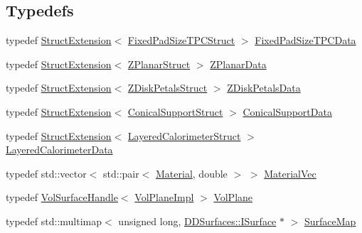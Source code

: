 \subsection*{Typedefs}
\begin{DoxyCompactItemize}
\item 
typedef \hyperlink{struct_d_d4hep_1_1_d_d_rec_1_1_struct_extension}{Struct\+Extension}$<$ \hyperlink{struct_d_d4hep_1_1_d_d_rec_1_1_fixed_pad_size_t_p_c_struct}{Fixed\+Pad\+Size\+T\+P\+C\+Struct} $>$ \hyperlink{namespace_d_d4hep_1_1_d_d_rec_a4fe537dc27f78fad18b8182f6f167ca1}{Fixed\+Pad\+Size\+T\+P\+C\+Data}
\item 
typedef \hyperlink{struct_d_d4hep_1_1_d_d_rec_1_1_struct_extension}{Struct\+Extension}$<$ \hyperlink{struct_d_d4hep_1_1_d_d_rec_1_1_z_planar_struct}{Z\+Planar\+Struct} $>$ \hyperlink{namespace_d_d4hep_1_1_d_d_rec_a33d4dff6a0b5ce47e490b050a3c5f69a}{Z\+Planar\+Data}
\item 
typedef \hyperlink{struct_d_d4hep_1_1_d_d_rec_1_1_struct_extension}{Struct\+Extension}$<$ \hyperlink{struct_d_d4hep_1_1_d_d_rec_1_1_z_disk_petals_struct}{Z\+Disk\+Petals\+Struct} $>$ \hyperlink{namespace_d_d4hep_1_1_d_d_rec_a589fa302569ee79d91b34ff0d97d4a78}{Z\+Disk\+Petals\+Data}
\item 
typedef \hyperlink{struct_d_d4hep_1_1_d_d_rec_1_1_struct_extension}{Struct\+Extension}$<$ \hyperlink{struct_d_d4hep_1_1_d_d_rec_1_1_conical_support_struct}{Conical\+Support\+Struct} $>$ \hyperlink{namespace_d_d4hep_1_1_d_d_rec_ad032e209cba53400573169b32816f1c9}{Conical\+Support\+Data}
\item 
typedef \hyperlink{struct_d_d4hep_1_1_d_d_rec_1_1_struct_extension}{Struct\+Extension}$<$ \hyperlink{struct_d_d4hep_1_1_d_d_rec_1_1_layered_calorimeter_struct}{Layered\+Calorimeter\+Struct} $>$ \hyperlink{namespace_d_d4hep_1_1_d_d_rec_ab7bf707189c3166efa20740e6f7524b9}{Layered\+Calorimeter\+Data}
\item 
typedef std\+::vector$<$ std\+::pair$<$ \hyperlink{class_d_d4hep_1_1_geometry_1_1_material}{Material}, double $>$ $>$ \hyperlink{namespace_d_d4hep_1_1_d_d_rec_a69fdab2f851316d2b9e50956920359f7}{Material\+Vec}
\item 
typedef \hyperlink{class_d_d4hep_1_1_d_d_rec_1_1_vol_surface_handle}{Vol\+Surface\+Handle}$<$ \hyperlink{class_d_d4hep_1_1_d_d_rec_1_1_vol_plane_impl}{Vol\+Plane\+Impl} $>$ \hyperlink{namespace_d_d4hep_1_1_d_d_rec_a6d192b28d640c45adbaa4d1ae9fb18b9}{Vol\+Plane}
\item 
typedef std\+::multimap$<$ unsigned long, \hyperlink{class_d_d_surfaces_1_1_i_surface}{D\+D\+Surfaces\+::\+I\+Surface} $\ast$ $>$ \hyperlink{namespace_d_d4hep_1_1_d_d_rec_a04db40c967eb23286f472ac1c17931d1}{Surface\+Map}

\end{DoxyCompactItemize}

